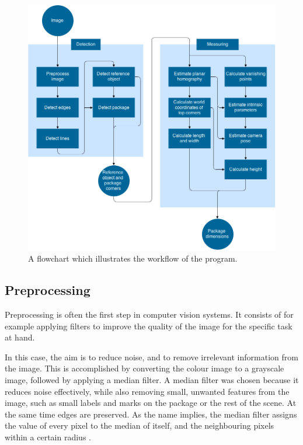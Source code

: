 \begin{figure}
\begin{center}
\includegraphics[width=1.0\textwidth]{figures/flowchart.png}
\end{center}
\caption{A flowchart which illustrates the workflow of the program.}
\label{fig:flowchart}
\end{figure}

\subsection{Preprocessing} \label{method:image_processing}
Preprocessing is often the first step in computer vision systems.
It consists of for example applying filters to improve the quality of the image for the specific task at hand.

In this case, the aim is to reduce noise, and to remove irrelevant information from the image.
This is accomplished by converting the colour image to a grayscale image, followed by applying a median filter. 
A median filter was chosen because it reduces noise effectively, while also removing small, unwanted features from the image, such as small labels and marks on the package or the rest of the scene.
At the same time edges are preserved.
As the name implies, the median filter assigns the value of every pixel to the median of itself, and the neighbouring pixels within a certain radius \cite{huang1979fast}.

